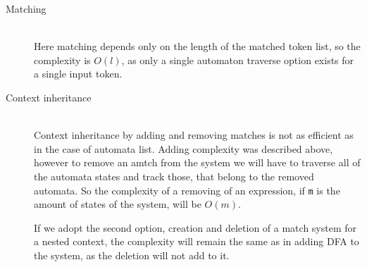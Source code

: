 \begin{description}
\item[Matching] \hfill \\

Here matching depends only on the length of the matched token list, so the
complexity is $O(l)$, as only a single automaton traverse option exists for a
single input token.

\item[Context inheritance] \hfill \\

Context inheritance by adding and removing matches is not as efficient as in
the case of automata list. Adding complexity was described above, however to
remove an amtch from the system we will have to traverse all of the automata
states and track those, that belong to the removed automata. So the complexity
of a removing of an expression, if \verb/m/ is the amount of states of the
system, will be $O(m)$.

If we adopt the second option, creation and deletion of a match system for a
nested context, the complexity will remain the same as in adding DFA to the
system, as the deletion will not add to it.

\end{description}
